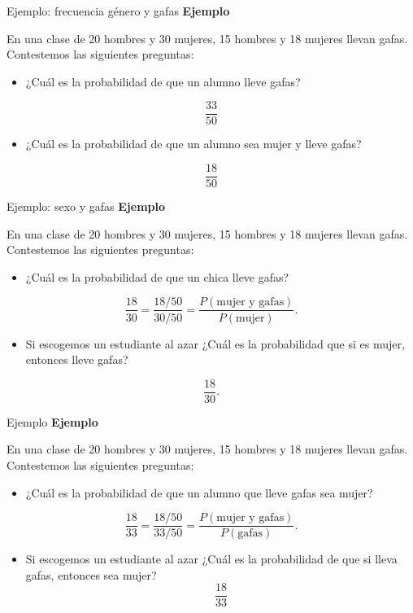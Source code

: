 \documentclass[
  ignorenonframetext,
  aspectratio=169]{beamer}
\providecommand{\tightlist}{%
  \setlength{\itemsep}{0pt}\setlength{\parskip}{0pt}}\usepackage{longtable,booktabs,array}
\begin{document}
\begin{frame}{Ejemplo: frecuencia género y gafas}
\label{ejemplo-frecuencia-guxe9nero-y-gafas}
\textbf{Ejemplo}

En una clase de 20 hombres y 30 mujeres, 15 hombres y 18 mujeres llevan
gafas. Contestemos las siguientes preguntas:

\begin{itemize}
\tightlist
\item
  ¿Cuál es la probabilidad de que un alumno lleve gafas?
\end{itemize}

\[
\frac{33}{50}
\]

\begin{itemize}
\tightlist
\item
  ¿Cuál es la probabilidad de que un alumno sea mujer y lleve gafas?
\end{itemize}

\[
\frac{18}{50}
\]
\end{frame}

\begin{frame}{Ejemplo: sexo y gafas}
\label{ejemplo-sexo-y-gafas}
\textbf{Ejemplo}

En una clase de 20 hombres y 30 mujeres, 15 hombres y 18 mujeres llevan
gafas. Contestemos las siguientes preguntas:

\begin{itemize}
\tightlist
\item
  ¿Cuál es la probabilidad de que un chica lleve gafas?
\end{itemize}

\[
\frac{18}{30}=\frac{18/50}{30/50}=\frac{P(\mbox{mujer  y gafas})}{P(\mbox{mujer})}.
\]

\begin{itemize}
\tightlist
\item
  Si escogemos un estudiante al azar ¿Cuál es la probabilidad que si es
  mujer, entonces lleve gafas?
\end{itemize}

\[
\frac{18}{30}.
\]
\end{frame}

\begin{frame}{Ejemplo}
\label{ejemplo}
\textbf{Ejemplo}

En una clase de 20 hombres y 30 mujeres, 15 hombres y 18 mujeres llevan
gafas. Contestemos las siguientes preguntas:

\begin{itemize}
\tightlist
\item
  ¿Cuál es la probabilidad de que un alumno que lleve gafas sea mujer?
\end{itemize}

\[
\frac{18}{33}=\frac{18/50}{33/50}=\frac{P(\mbox{mujer y gafas})}{P(\mbox{gafas})}.
\]

\begin{itemize}
\tightlist
\item
  Si escogemos un estudiante al azar ¿Cuál es la probabilidad de que si
  lleva gafas, entonces sea mujer? \[
  \frac{18}{33}
  \]
\end{itemize}
\end{frame}
\end{document}
